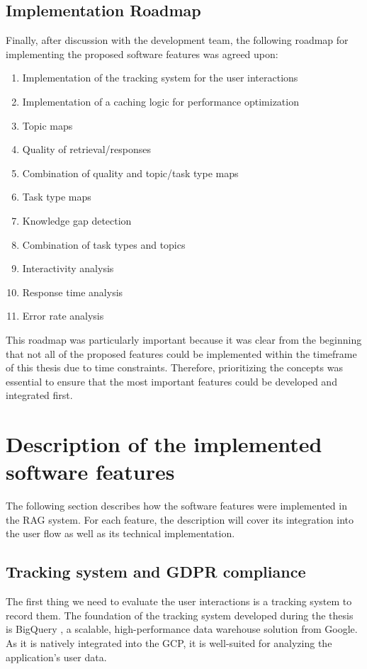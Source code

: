 \documentclass[
	english,
	ruledheaders=section,%
	class=report,%
	thesis={type=bachelor},%
	accentcolor=1b,%
	custommargins=true,%
	marginpar=false,%
	parskip=half-,%
	fontsize=11pt,%
	DIV=14,
]{tudapub}
\begin{document}
\subsection{Implementation Roadmap}
Finally, after discussion with the development team, the following roadmap for implementing the proposed software features was agreed upon:
\begin{enumerate}
    \item Implementation of the tracking system for the user interactions
    \item Implementation of a caching logic for performance optimization
    \item Topic maps
    \item Quality of retrieval/responses
    \item Combination of quality and topic/task type maps
    \item Task type maps
    \item Knowledge gap detection
    \item Combination of task types and topics
    \item Interactivity analysis
    \item Response time analysis
    \item Error rate analysis
\end{enumerate}
This roadmap was particularly important because it was clear from the beginning that not all of the proposed features could be implemented within the timeframe of this thesis due to time constraints. Therefore, prioritizing the concepts was essential to ensure that the most important features could be developed and integrated first.
\section{Description of the implemented software features}
The following section describes how the software features were implemented in the RAG system. For each feature, the description will cover its integration into the user flow as well as its technical implementation.
\subsection{Tracking system and GDPR compliance}
The first thing we need to evaluate the user interactions is a tracking system to record them. The foundation of the tracking system developed during the thesis is BigQuery \parencite{GoogleBigQuery}, a scalable, high-performance data warehouse solution from Google. As it is natively integrated into the GCP, it is well-suited for analyzing the application's user data.
\end{document}
